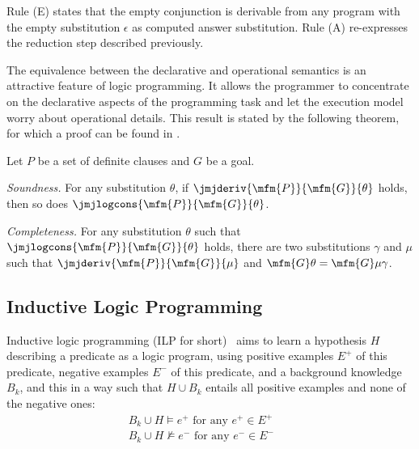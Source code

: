 Rule (E) states that the empty conjunction is derivable from any
program with the empty substitution $\epsilon$ as computed answer
substitution.  Rule (A) re-expresses the reduction step described
previously.

The equivalence between the declarative and operational semantics is
an attractive feature of logic programming.  It allows the programmer
to concentrate on the declarative aspects of the programming task and
let the execution model worry about operational details. This result
is stated by the following theorem, for which a proof can be found in
\cite{Lloyd}.


\begin{thm}
Let $P$ be a set of definite clauses and $G$ be a goal.

\begin{thmprop}

\item
{\em Soundness.\/}
For any substitution $\theta$, if 
\( \jmjderiv{ \mfm{P} }{ \mfm{G} }{ \theta } \)
holds, then so does
\( \jmjlogcons{ \mfm{P} }{ \mfm{G} }{ \theta } \).

\item
{\em Completeness.\/}
For any substitution $\theta$ such that
\( \jmjlogcons{ \mfm{P} }{ \mfm{G} }{ \theta } \)
holds, there are two substitutions $\gamma$ and $\mu$ such that 
\( \jmjderiv { \mfm{P} }{ \mfm{G} }{ \mu } \)
and
\( \mfm{G}\theta = \mfm{G}\mu\gamma \).

\end{thmprop}
\end{thm}


\subsection{Inductive Logic Programming}

Inductive logic programming (ILP for short)~\cite{muggleton1995inverse} aims to learn a hypothesis $H$
describing a predicate as a logic program, using positive examples $E^+$ of this predicate, negative
examples $E^-$ of this predicate, and a background knowledge $B_k$, and this in a way such that
$H \cup B_k$ entails all positive examples and none of the negative ones:
%
\begin{eqnarray} 
B_k \cup H \models e^+ \mbox{ for any } e^+ \in E^+ & & \label{posentail} \\
B_k \cup H  \nvDash e^- \mbox{ for any } e^- \in E^- & \label{negentail}
\end{eqnarray}


